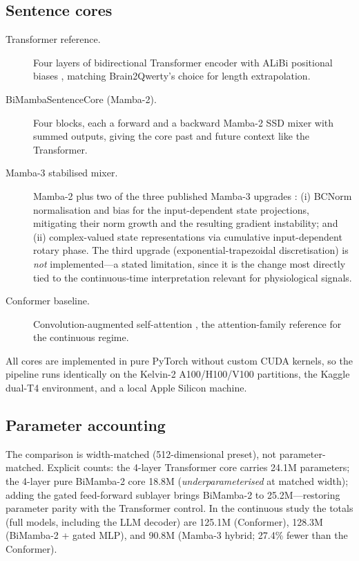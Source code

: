 \documentclass[11pt,a4paper]{report}
\begin{document}
\subsection{Sentence cores}
\label{sec:cores}
\begin{description}
  \item[Transformer reference.] Four layers of bidirectional Transformer
  encoder with ALiBi positional biases \citep{press2021alibi}, matching
  Brain2Qwerty's choice for length extrapolation.
  \item[BiMambaSentenceCore (Mamba-2).] Four blocks, each a forward and a
  backward Mamba-2 SSD mixer \citep{dao2024transformers} with summed outputs,
  giving the core past and future context like the Transformer.
  \item[Mamba-3 stabilised mixer.] Mamba-2 plus two of the three published
  Mamba-3 upgrades \citep{lahoti2026mamba3}: (i) BCNorm normalisation and
  bias for the input-dependent state projections, mitigating their norm
  growth and the resulting gradient instability; and (ii) complex-valued
  state representations via cumulative input-dependent rotary phase. The
  third upgrade (exponential-trapezoidal discretisation) is \emph{not}
  implemented---a stated limitation, since it is the change most directly
  tied to the continuous-time interpretation relevant for physiological
  signals.
  \item[Conformer baseline.] Convolution-augmented self-attention
  \citep{gulati2020conformer}, the attention-family reference for the
  continuous regime.
\end{description}

All cores are implemented in pure PyTorch without custom CUDA kernels, so the
pipeline runs identically on the Kelvin-2 A100/H100/V100 partitions, the
Kaggle dual-T4 environment, and a local Apple Silicon machine.

\subsection{Parameter accounting}
\label{sec:params}
The comparison is width-matched (512-dimensional preset), not
parameter-matched. Explicit counts: the 4-layer Transformer core carries
24.1M parameters; the 4-layer pure BiMamba-2 core 18.8M
(\emph{underparameterised} at matched width); adding the gated feed-forward
sublayer brings BiMamba-2 to 25.2M---restoring parameter parity with the
Transformer control. In the continuous study the totals (full models,
including the LLM decoder) are 125.1M (Conformer), 128.3M (BiMamba-2 + gated
MLP), and 90.8M (Mamba-3 hybrid; 27.4\% fewer than the Conformer).
\end{document}
